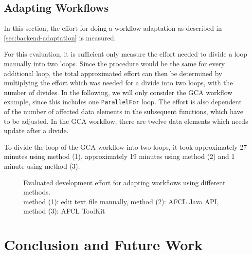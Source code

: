 \documentclass[a4paper,top=25mm,bottom=25mm,12pt,pdftex,halfparskip,twoside,bibtotoc,numbers=noenddot]{scrbook}
\begin{document}
\section{Adapting Workflows}
\label{sec:evaluation-adapting}

In this section, the effort for doing a workflow adaptation as described in \ref{sec:backend-adaptation} is measured.

For this evaluation, it is sufficient only measure the effort needed to divide a loop manually into two loops. Since the procedure would be the same for every additional loop, the total approximated effort can then be determined by multiplying the effort which was needed for a divide into two loops, with the number of divides.
In the following, we will only consider the GCA workflow example, since this includes one \texttt{ParallelFor} loop.
The effort is also dependent of the number of affected data elements in the subsequent functions, which have to be adjusted. In the GCA workflow, there are twelve data elements which needs update after a divide.

To divide the loop of the GCA workflow into two loops, it took approximately 27 minutes using method (1), approximately 19 minutes using method (2) and 1 minute using method (3).

\begin{figure}[h]
\caption{Evaluated development effort for adapting workflows using different methods.\\ \small{method (1): edit text file manually, method (2): AFCL Java API, method (3): AFCL ToolKit}}
\label{fig:evaluation-adaptation}
\end{figure}



\chapter{Conclusion and Future Work}



\printbibliography
\end{document}
